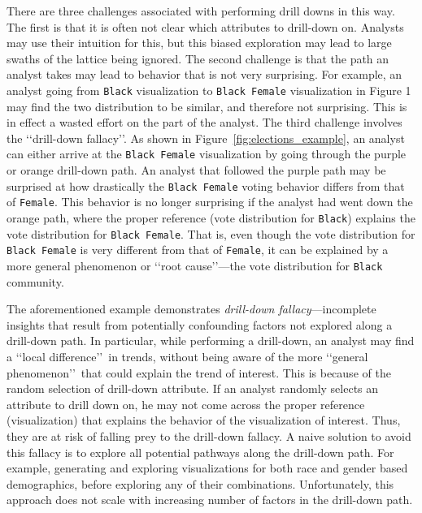 There are three challenges associated with performing drill downs in this way. The first is that it is often not clear which attributes to drill-down on. Analysts may use their intuition for this, but this biased exploration may lead to large swaths of the lattice being ignored. The second challenge is that the path an analyst takes may lead to behavior that is not very surprising.  
For example, an analyst going from \texttt{Black} visualization to \texttt{Black Female} visualization in Figure 1 may find the two distribution to be similar, and therefore not surprising. This is in effect a wasted effort on the part of the analyst. The third challenge involves the \lq\lq drill-down fallacy\rq\rq . As shown in Figure~\ref{fig:elections_example}, an analyst can either arrive at the \texttt{Black Female} visualization by going through the purple or orange drill-down path. An analyst that followed the purple path may be surprised at how drastically the \texttt{Black Female} voting behavior differs from that of \texttt{Female}. This behavior is no longer surprising if the analyst had went down the orange path, where the proper reference (vote distribution for \texttt{Black}) explains the vote distribution for \texttt{Black Female}. That is, even though the vote distribution for 
\texttt{Black Female} is very different from that of \texttt{Female}, it can be explained by a more general phenomenon or \lq\lq root cause\rq\rq ---the vote distribution for \texttt{Black} community.

The aforementioned example demonstrates \emph{drill-down fallacy}---incomplete insights that result from potentially confounding factors not explored along a drill-down path. In particular, while performing a drill-down, an analyst may find a \lq\lq local difference\rq\rq\ in trends, without being aware of the more \lq\lq general phenomenon\rq\rq\ that could explain the trend of interest. This is because of the random selection of drill-down attribute. If an analyst randomly selects an attribute to drill down on, he may not come across the proper reference (visualization) that explains the behavior of the visualization of interest. Thus, they are at risk of falling prey to the drill-down fallacy. A naive solution to avoid this fallacy is to explore all potential pathways along the drill-down path. For example, generating and exploring visualizations for both race and gender based demographics, before exploring any of their combinations. Unfortunately, this approach does not scale with increasing number of factors in the drill-down path.

